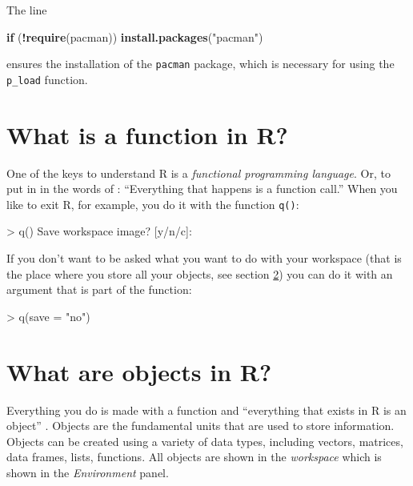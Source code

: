 \documentclass[
  12pt,
  oneside]{book}
\newenvironment{Shaded}{\begin{snugshade}}{\end{snugshade}}
\newcommand{\ControlFlowTok}[1]{\textcolor[rgb]{0.13,0.29,0.53}{\textbf{#1}}}
\newcommand{\FunctionTok}[1]{\textcolor[rgb]{0.13,0.29,0.53}{\textbf{#1}}}
\newcommand{\NormalTok}[1]{#1}
\newcommand{\SpecialCharTok}[1]{\textcolor[rgb]{0.81,0.36,0.00}{\textbf{#1}}}
\newcommand{\StringTok}[1]{\textcolor[rgb]{0.31,0.60,0.02}{#1}}
\begin{document}
The line

\begin{Shaded}
\begin{Highlighting}[]
\ControlFlowTok{if}\NormalTok{ (}\SpecialCharTok{!}\FunctionTok{require}\NormalTok{(pacman)) }\FunctionTok{install.packages}\NormalTok{(}\StringTok{"pacman"}\NormalTok{)}
\end{Highlighting}
\end{Shaded}

ensures the installation of the \texttt{pacman} package, which is necessary for using the \texttt{p\_load} function.

\hypertarget{what-is-a-function-in-r}{%
\section{What is a function in R?}\label{what-is-a-function-in-r}}

One of the keys to understand R is a \emph{functional programming language}. Or, to put in in the words of \citet[p.~4]{Chambers2017Extending}: ``Everything that happens is a function call.'' When you like to exit R, for example, you do it with the function \texttt{q()}:

\begin{Shaded}
\begin{Highlighting}[]
\NormalTok{\textgreater{} q()}
\NormalTok{Save workspace image? [y/n/c]: }
\end{Highlighting}
\end{Shaded}

If you don't want to be asked what you want to do with your workspace (that is the place where you store all your objects, see section \ref{sec:objects}) you can do it with an argument that is part of the function:

\begin{Shaded}
\begin{Highlighting}[]
\NormalTok{\textgreater{} q(save = "no")}
\end{Highlighting}
\end{Shaded}

\hypertarget{sec:objects}{%
\section{What are objects in R?}\label{sec:objects}}

Everything you do is made with a function and ``everything that exists in R is an object'' \citep[p.~4]{Chambers2017Extending}. Objects are the fundamental units that are used to store information. Objects can be created using a variety of data types, including vectors, matrices, data frames, lists, functions. All objects are shown in the \emph{workspace} which is shown in the \emph{Environment} panel.
\end{document}
